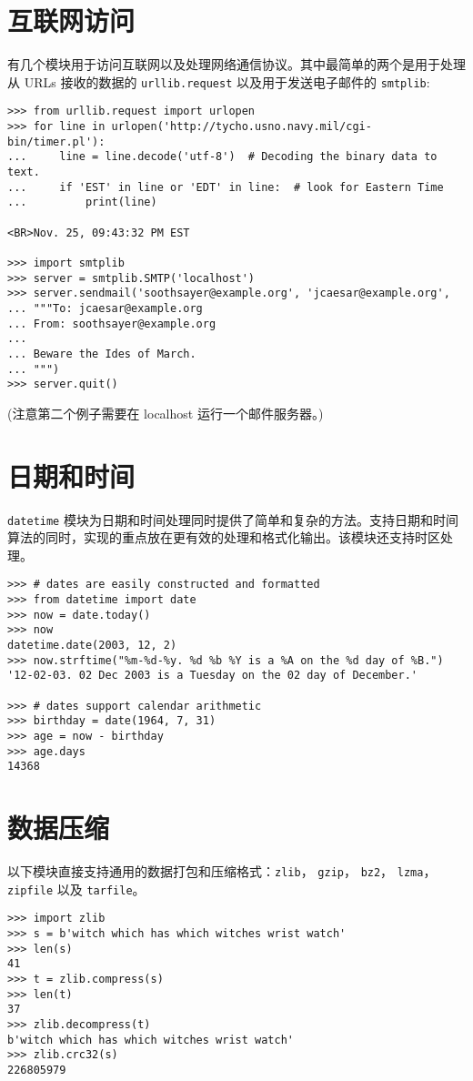 \section{互联网访问}
有几个模块用于访问互联网以及处理网络通信协议。其中最简单的两个是用于处理从 URLs 接收的数据的 \texttt{urllib.request} 以及用于发送电子邮件的 \texttt{smtplib}:
\begin{lstlisting}
>>> from urllib.request import urlopen
>>> for line in urlopen('http://tycho.usno.navy.mil/cgi-bin/timer.pl'):
...     line = line.decode('utf-8')  # Decoding the binary data to text.
...     if 'EST' in line or 'EDT' in line:  # look for Eastern Time
...         print(line)

<BR>Nov. 25, 09:43:32 PM EST

>>> import smtplib
>>> server = smtplib.SMTP('localhost')
>>> server.sendmail('soothsayer@example.org', 'jcaesar@example.org',
... """To: jcaesar@example.org
... From: soothsayer@example.org
...
... Beware the Ides of March.
... """)
>>> server.quit()
\end{lstlisting}
(注意第二个例子需要在 localhost 运行一个邮件服务器。)
\section{日期和时间}
\texttt{datetime} 模块为日期和时间处理同时提供了简单和复杂的方法。支持日期和时间算法的同时，实现的重点放在更有效的处理和格式化输出。该模块还支持时区处理。
\begin{lstlisting}
>>> # dates are easily constructed and formatted
>>> from datetime import date
>>> now = date.today()
>>> now
datetime.date(2003, 12, 2)
>>> now.strftime("%m-%d-%y. %d %b %Y is a %A on the %d day of %B.")
'12-02-03. 02 Dec 2003 is a Tuesday on the 02 day of December.'

>>> # dates support calendar arithmetic
>>> birthday = date(1964, 7, 31)
>>> age = now - birthday
>>> age.days
14368
\end{lstlisting}
\section{数据压缩}
以下模块直接支持通用的数据打包和压缩格式：\texttt{zlib}， \texttt{gzip}， \texttt{bz2}， \texttt{lzma}， \texttt{zipfile} 以及 \texttt{tarfile}。
\begin{lstlisting}
>>> import zlib
>>> s = b'witch which has which witches wrist watch'
>>> len(s)
41
>>> t = zlib.compress(s)
>>> len(t)
37
>>> zlib.decompress(t)
b'witch which has which witches wrist watch'
>>> zlib.crc32(s)
226805979
\end{lstlisting}
